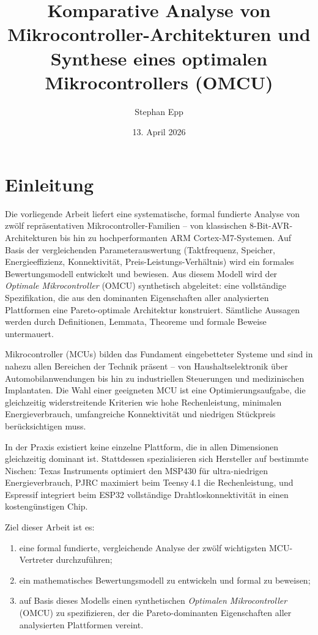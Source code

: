 ﻿\documentclass[12pt, a4paper]{article}
\title{Komparative Analyse von Mikrocontroller-Architekturen und Synthese eines optimalen Mikrocontrollers (OMCU)}
\author{Stephan Epp}
\date{13. April 2026}
\theoremstyle{plain}
\theoremstyle{definition}
\theoremstyle{remark}
\newcommand{\omcu}{\textsc{OMCU}}
\newcommand{\arm}{\textsc{ARM}}
\begin{document}
\maketitle
\tableofcontents
\newpage

\section{Einleitung}
\label{sec:einleitung}
    Die vorliegende Arbeit liefert eine systematische, formal fundierte Analyse
von zwölf repräsentativen Mikrocontroller-Familien -- von klassischen
8-Bit-\textsc{AVR}-Architekturen bis hin zu hochperformanten
\arm{} Cortex-M7-Systemen.
Auf Basis der vergleichenden Parameterauswertung (Taktfrequenz, Speicher,
Energieeffizienz, Konnektivität, Preis-Leistungs-Verhältnis) wird ein
formales Bewertungsmodell entwickelt und bewiesen.
Aus diesem Modell wird der \emph{Optimale Mikrocontroller} (\omcu{})
synthetisch abgeleitet: eine vollständige Spezifikation, die aus den
dominanten Eigenschaften aller analysierten Plattformen eine
Pareto-optimale Architektur konstruiert.
Sämtliche Aussagen werden durch Definitionen, Lemmata, Theoreme und
formale Beweise untermauert.

Mikrocontroller (MCUs) bilden das Fundament eingebetteter Systeme und sind in
nahezu allen Bereichen der Technik präsent -- von Haushaltselektronik über
Automobilanwendungen bis hin zu industriellen Steuerungen und medizinischen
Implantaten.
Die Wahl einer geeigneten MCU ist eine Optimierungsaufgabe, die gleichzeitig
widerstreitende Kriterien wie hohe Rechenleistung, minimalen Energieverbrauch,
umfangreiche Konnektivität und niedrigen Stückpreis berücksichtigen muss.

In der Praxis existiert keine einzelne Plattform, die in allen Dimensionen
gleichzeitig dominant ist.
Stattdessen spezialisieren sich Hersteller auf bestimmte Nischen:
Texas Instruments optimiert den MSP430 für ultra-niedrigen Energieverbrauch,
PJRC maximiert beim Teensy\,4.1 die Rechenleistung, und Espressif integriert
beim ESP32 vollständige Drahtloskonnektivität in einen kostengünstigen Chip.

Ziel dieser Arbeit ist es:
\begin{enumerate}[label=(\roman*)]
  \item eine formal fundierte, vergleichende Analyse der zwölf wichtigsten
        MCU-Vertreter durchzuführen;
  \item ein mathematisches Bewertungsmodell zu entwickeln und formal zu beweisen;
  \item auf Basis dieses Modells einen synthetischen \emph{Optimalen
        Mikrocontroller} (\omcu{}) zu spezifizieren, der die Pareto-dominanten
        Eigenschaften aller analysierten Plattformen vereint.
\end{enumerate}
\end{document}
